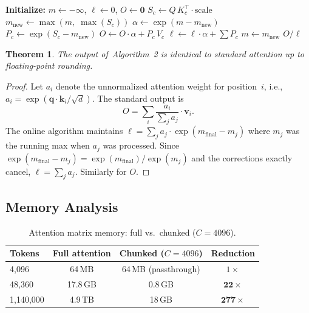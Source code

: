 \documentclass[11pt,a4paper]{article}
\newtheorem{theorem}{Theorem}
\begin{document}
\begin{algorithm}[H]
\caption{Chunked Attention with Online Softmax}
\begin{algorithmic}[1]
\STATE \textbf{Initialize:} $m \gets -\infty$,\; $\ell \gets 0$,\; $O \gets \mathbf{0}$
  \STATE $S_c \gets Q \, K_c^\top \cdot \text{scale}$
  \STATE $m_\text{new} \gets \max(m,\; \max(S_c))$
  \STATE $\alpha \gets \exp(m - m_\text{new})$
  \STATE $P_c \gets \exp(S_c - m_\text{new})$
  \STATE $O \gets O \cdot \alpha + P_c \, V_c$
  \STATE $\ell \gets \ell \cdot \alpha + \sum P_c$
  \STATE $m \gets m_\text{new}$
\ENDFOR
\RETURN $O / \ell$
\end{algorithmic}
\end{algorithm}

\begin{theorem}
The output of~Algorithm~2 is identical to standard attention up to floating-point rounding.
\end{theorem}

\begin{proof}
Let $a_i$ denote the unnormalized attention weight for position~$i$, i.e., $a_i = \exp(\mathbf{q} \cdot \mathbf{k}_i / \sqrt{d})$. The standard output is
\begin{equation}
  O = \sum_{i} \frac{a_i}{\sum_{j} a_j} \cdot \mathbf{v}_i.
\end{equation}
The online algorithm maintains $\ell = \sum_{j} a_j \cdot \exp(m_\text{final} - m_j)$ where $m_j$ was the running max when $a_j$ was processed. Since $\exp(m_\text{final} - m_j) = \exp(m_\text{final})/\exp(m_j)$ and the corrections exactly cancel, $\ell = \sum_{j} a_j$. Similarly for $O$. \qedhere
\end{proof}

\subsection{Memory Analysis}

\begin{table}[h]
\centering
\caption{Attention matrix memory: full vs.\ chunked ($C=4096$).}
\label{tab:chunked-memory}
\begin{tabular}{lccc}
\toprule
\textbf{Tokens} & \textbf{Full attention} & \textbf{Chunked ($C\!=\!4096$)} & \textbf{Reduction} \\
\midrule
4,096     & 64\,MB  & 64\,MB (passthrough) & $1\times$ \\
48,360    & 17.8\,GB & 0.8\,GB & $\mathbf{22\times}$ \\
1,140,000 & 4.9\,TB  & 18\,GB  & $\mathbf{277\times}$ \\
\bottomrule
\end{tabular}
\end{table}
\end{document}
